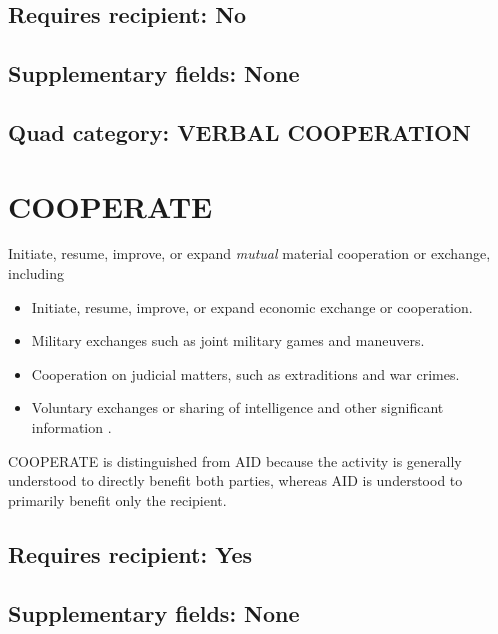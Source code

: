 \documentclass[11pt]{report}
\newcommand{\plcat}[1]{\textsf{#1}}
\newcommand{\ti}[1]{\textit{#1}}
\begin{document}
\subsection{Requires recipient: No}

\subsection{Supplementary fields: None}
 
\subsection{Quad category: VERBAL COOPERATION}


\newpage  

\section{COOPERATE}

Initiate, resume, improve, or expand \ti{mutual} material cooperation or exchange, including

\begin{itemize}
\item Initiate, resume, improve, or expand economic exchange or cooperation.

\item Military exchanges such as joint military games and maneuvers.

\item Cooperation on judicial matters, such as extraditions and war crimes.

\item Voluntary exchanges or sharing of intelligence and other significant information .

\end{itemize}

\noindent \plcat{COOPERATE} is distinguished from \plcat{AID} because the activity is generally understood to directly benefit both parties, whereas  \plcat{AID} is understood to primarily benefit only the recipient. 

\subsection{Requires recipient: Yes}

\subsection{Supplementary fields: None}
\end{document}
